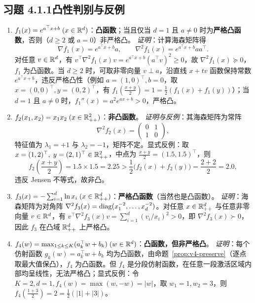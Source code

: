 \subsection*{习题 4.1.1\quad 凸性判别与反例}
\begin{enumerate}[label=(\alph*), leftmargin=1.8em]
  \item \textbf{$f_1(x) = e^{a^\top x + b}\;(x\in\mathbb{R}^d)$}：\textbf{凸函数}；当且仅当 $d = 1$ 且 $a \neq 0$ 时为\textbf{严格凸函数}，否则（$d \ge 2$ 或 $a = 0$）非严格凸。
  \emph{证明}：计算海森矩阵得
  \[
    \nabla f_1(x) = e^{a^\top x + b} a, \qquad
    \nabla^2 f_1(x) = e^{a^\top x + b} a a^\top.
  \]
  对任意 $v \in \mathbb{R}^d$，有 $v^\top \nabla^2 f_1(x) v = e^{a^\top x + b}(a^\top v)^2 \ge 0$，故 $\nabla^2 f_1(x) \succeq 0$，$f_1$ 为凸函数。当 $d \ge 2$ 时，可取非零向量 $v \perp a$，沿直线 $x + tv$ 函数保持常数 $e^{a^\top x + b}$，违反严格凸性（例如 $a=(1,0)^\top, b=0$，取 $x=(0,0)^\top, y=(0,2)^\top$，有 $f_1(\frac{x+y}{2}) = 1 = \frac{1}{2}(f_1(x)+f_1(y))$）；当 $d = 1$ 且 $a \neq 0$ 时，$f_1''(x) = a^2 e^{ax+b} > 0$，严格凸。

  \item \textbf{$f_2(x_1, x_2) = x_1 x_2\;(x \in \mathbb{R}_{++}^2)$}：\textbf{非凸函数}。
  \emph{证明与反例}：其海森矩阵为常阵
  \[
    \nabla^2 f_2(x) = \begin{pmatrix} 0 & 1 \\ 1 & 0 \end{pmatrix},
  \]
  特征值为 $\lambda_1 = +1$ 与 $\lambda_2 = -1$，矩阵不定。显式反例：取 $x = (1, 2)^\top,\; y = (2, 1)^\top \in \mathbb{R}_{++}^2$，中点为 $\frac{x+y}{2} = (1.5, 1.5)^\top$，则
  \[
    f_2\!\left(\frac{x+y}{2}\right) = 1.5 \times 1.5 = 2.25 > \frac{1}{2}\big(f_2(x) + f_2(y)\big) = \frac{2 + 2}{2} = 2.0,
  \]
  违反 Jensen 不等式，故非凸。

  \item \textbf{$f_3(x) = -\sum_{i=1}^d \ln x_i\;(x \in \mathbb{R}_{++}^d)$}：\textbf{严格凸函数}（当然也是凸函数）。
  \emph{证明}：海森矩阵为对角阵 $\nabla^2 f_3(x) = \operatorname{diag}(x_1^{-2}, \dots, x_d^{-2})$。对任意 $x \in \mathbb{R}_{++}^d$ 与任意非零向量 $v \in \mathbb{R}^d$，有 $v^\top \nabla^2 f_3(x) v = \sum_{i=1}^d (v_i / x_i)^2 > 0$，即 $\nabla^2 f_3(x) \succ 0$，因此 $f_3$ 在凸域 $\mathbb{R}_{++}^d$ 上严格凸。

  \item \textbf{$f_4(w) = \max_{1\le k\le K}(a_k^\top w + b_k)\;(w\in\mathbb{R}^d)$}：\textbf{凸函数，但非严格凸}。
  \emph{证明}：每个仿射函数 $g_k(w) = a_k^\top w + b_k$ 均为凸函数，由命题~\ref{prop:v4-preserve}（逐点取最大值保凸），$f_4$ 为凸函数。但 $f_4$ 是分段仿射函数，在任意一段激活区域内部均呈线性，无法严格凸；显式反例：令 $K=2, d=1, f_4(w)=\max(w, -w) = |w|$，取 $w_1 = 1, w_2 = 3$，则 $f_4(\frac{1+3}{2}) = 2 = \frac{1}{2}(|1| + |3|)$。
\end{enumerate}

